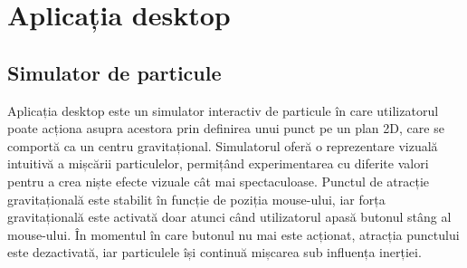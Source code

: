 \chapter{Aplicația desktop}

\section{Simulator de particule}
Aplicația desktop este un simulator interactiv de particule în care utilizatorul poate acționa asupra acestora prin definirea unui punct pe un plan 2D, care se comportă ca un centru gravitațional. Simulatorul oferă o reprezentare vizuală intuitivă a mișcării particulelor, permițând experimentarea cu diferite valori pentru a crea niște efecte vizuale cât mai spectaculoase. Punctul de atracție gravitațională este stabilit în funcție de poziția mouse-ului, iar forța gravitațională este activată doar atunci când utilizatorul apasă butonul stâng al mouse-ului. În momentul în care butonul nu mai este acționat, atracția punctului este dezactivată, iar particulele își continuă mișcarea sub influența inerției. 

